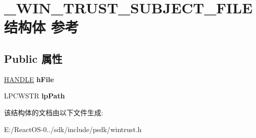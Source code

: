 \hypertarget{struct___w_i_n___t_r_u_s_t___s_u_b_j_e_c_t___f_i_l_e}{}\section{\+\_\+\+W\+I\+N\+\_\+\+T\+R\+U\+S\+T\+\_\+\+S\+U\+B\+J\+E\+C\+T\+\_\+\+F\+I\+L\+E结构体 参考}
\label{struct___w_i_n___t_r_u_s_t___s_u_b_j_e_c_t___f_i_l_e}
\subsection*{Public 属性}
\begin{DoxyCompactItemize}
\item 
\mbox{\label{struct___w_i_n___t_r_u_s_t___s_u_b_j_e_c_t___f_i_l_e_a5bbe3a3bd25e9183c152cc9eac392d84}} 
\hyperlink{interfacevoid}{H\+A\+N\+D\+LE} {\bfseries h\+File}
\item 
\mbox{\label{struct___w_i_n___t_r_u_s_t___s_u_b_j_e_c_t___f_i_l_e_a631f8e82a654374d86d4f050a6f660bd}} 
L\+P\+C\+W\+S\+TR {\bfseries lp\+Path}
\end{DoxyCompactItemize}


该结构体的文档由以下文件生成\+:\begin{DoxyCompactItemize}
\item 
E\+:/\+React\+O\+S-\/0../sdk/include/psdk/wintrust.\+h\end{DoxyCompactItemize}
